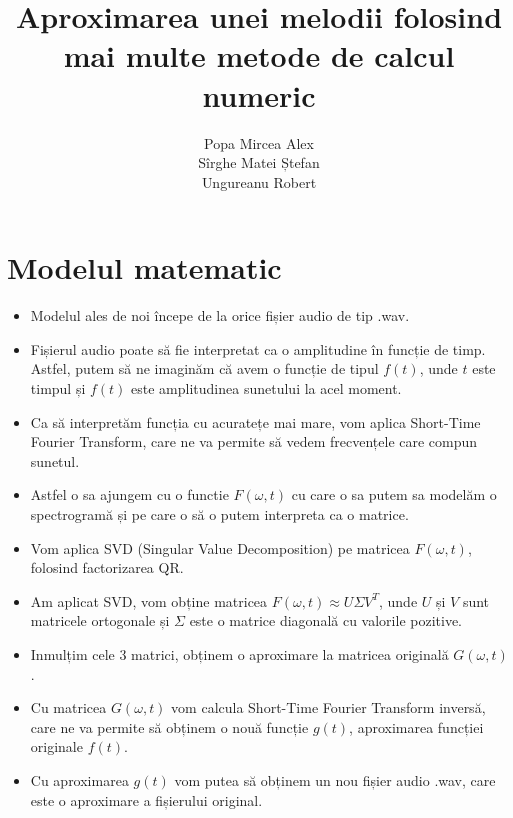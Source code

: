 \documentclass[english]{article}
\begin{document}
\title{Aproximarea unei melodii folosind mai multe metode de calcul numeric}

\author{
  Popa Mircea Alex \\
  Sîrghe Matei Ștefan \\
  Ungureanu Robert
}

\maketitle

\section{Modelul matematic}\label{Modelul}
\begin{itemize}
\item Modelul ales de noi începe de la orice fișier audio de tip .wav.\\
\item Fișierul audio poate să fie interpretat ca o amplitudine în funcție de timp. Astfel, putem să ne imaginăm că avem o funcție de tipul $f(t)$, unde $t$ este timpul și $f(t)$ este amplitudinea sunetului la acel moment.\\
\item Ca să interpretăm funcția cu acuratețe mai mare, vom aplica Short-Time Fourier Transform, care ne va permite să vedem frecvențele care compun sunetul.\\
\item Astfel o sa ajungem cu o functie $F(\omega,t)$ cu care o sa putem sa modelăm o spectrogramă și pe care o să o putem interpreta ca o matrice.\\
\item Vom aplica SVD (Singular Value Decomposition) pe matricea $F(\omega,t)$, folosind factorizarea QR.\\
\item Am aplicat SVD, vom obține matricea $F(\omega,t) \approx U \Sigma V^T$, unde $U$ și $V$ sunt matricele ortogonale și $\Sigma$ este o matrice diagonală cu valorile pozitive.\\
\item Inmulțim cele 3 matrici, obținem o aproximare la matricea originală $G(\omega,t)$. \\ 
\item Cu matricea $G(\omega,t)$ vom calcula Short-Time Fourier Transform inversă, care ne va permite să obținem o nouă funcție $g(t)$, aproximarea funcției originale $f(t)$.\\
\item Cu aproximarea $g(t)$ vom putea să obținem un nou fișier audio .wav, care este o aproximare a fișierului original.\\
\end{itemize}
\end{document}
